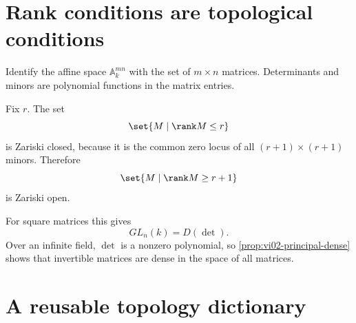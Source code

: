 \section{Rank conditions are topological conditions}
\label{sec:vi02-rank}

Identify the affine space \(\mathbb A_k^{mn}\) with the set of \(m\times n\) matrices.
Determinants and minors are polynomial functions in the matrix entries.

\begin{proposition}
Fix \(r\).  The set
\[
\set{M\mid \rank M\le r}
\]
is Zariski closed, because it is the common zero locus of all \((r+1)\times(r+1)\)
minors.  Therefore
\[
\set{M\mid \rank M\ge r+1}
\]
is Zariski open.
\end{proposition}

For square matrices this gives
\[
GL_n(k)=D(\det).
\]
Over an infinite field, \(\det\) is a nonzero polynomial, so \cref{prop:vi02-principal-dense}
shows that invertible matrices are dense in the space of all matrices.

\begin{center}
\end{center}

\section{A reusable topology dictionary}
\label{sec:vi02-dictionary}

